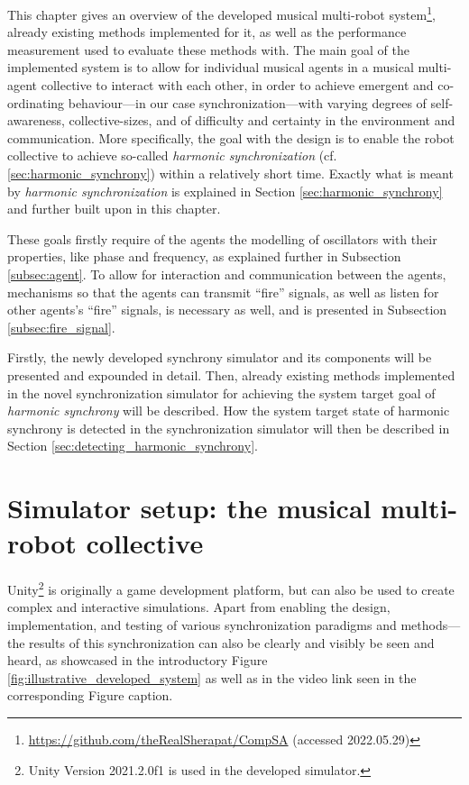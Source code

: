 This chapter gives an overview of the developed musical multi-robot system\footnote{\url{https://github.com/theRealSherapat/CompSA} (accessed 2022.05.29)}, already existing methods implemented for it, as well as the performance measurement used to evaluate these methods with. The main goal of the implemented system is to allow for individual musical agents in a musical multi-agent collective to interact with each other, in order to achieve emergent and co-ordinating behaviour—in our case synchronization—with varying degrees of self-awareness, collective-sizes, and of difficulty and certainty in the environment and communication. More specifically, the goal with the design is to enable the robot collective to achieve so-called \textit{harmonic synchronization} (cf. \ref{sec:harmonic_synchrony}) within a relatively short time. Exactly what is meant by \textit{harmonic synchronization} is explained in Section \ref{sec:harmonic_synchrony} and further built upon in this chapter.

These goals firstly require of the agents the modelling of oscillators with their properties, like phase and frequency, as explained further in Subsection \ref{subsec:agent}. To allow for interaction and communication between the agents, mechanisms so that the agents can transmit ``fire'' signals, as well as listen for other agents's ``fire'' signals, is necessary as well, and is presented in Subsection \ref{subsec:fire_signal}.

Firstly, the newly developed synchrony simulator and its components will be presented and expounded in detail. Then, already existing methods implemented in the novel synchronization simulator for achieving the system target goal of \textit{harmonic synchrony} will be described. How the system target state of harmonic synchrony is detected in the synchronization simulator will then be described in Section \ref{sec:detecting_harmonic_synchrony}.



\section{Simulator setup: the musical multi-robot collective}
\label{sec:developed_system}

Unity\footnote{Unity Version 2021.2.0f1 is used in the developed simulator.} is originally a game development platform, but can also be used to create complex and interactive simulations. Apart from enabling the design, implementation, and testing of various synchronization paradigms and methods—the results of this synchronization can also be clearly and visibly be seen and heard, as showcased in the introductory Figure \ref{fig:illustrative_developed_system} as well as in the video link seen in the corresponding Figure caption.

